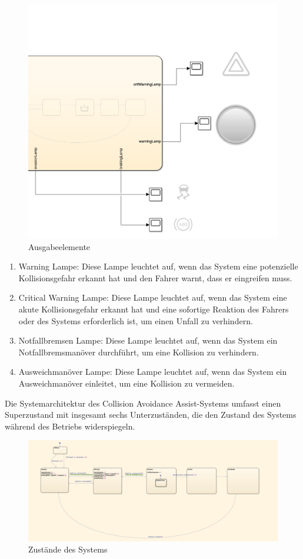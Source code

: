 \begin{figure}[H]
	\centering	
	\includegraphics[width=.8\textwidth]{img/ausgabeelemente}
	\caption[Ausgabeelemente]{Ausgabeelemente}
	\label{fig:Ausgabeelemente des Simulink-Modells}
\end{figure}
\begin{enumerate}
	\item Warning Lampe: Diese Lampe leuchtet auf, wenn das System eine potenzielle Kollisionsgefahr erkannt hat und den Fahrer warnt, dass er eingreifen muss.
	\item Critical Warning Lampe: Diese Lampe leuchtet auf, wenn das System eine akute Kollisionsgefahr erkannt hat und eine sofortige Reaktion des Fahrers oder des Systems erforderlich ist, um einen Unfall zu verhindern.
	\item Notfallbremsen Lampe: Diese Lampe leuchtet auf, wenn das System ein Notfallbremsmanöver durchführt, um eine Kollision zu verhindern.
	\item Ausweichmanöver Lampe: Diese Lampe leuchtet auf, wenn das System ein Ausweichmanöver einleitet, um eine Kollision zu vermeiden.
\end{enumerate}
Die Systemarchitektur des Collision Avoidance Assist-Systems umfasst einen Superzustand mit insgesamt sechs Unterzuständen, die den Zustand des Systems während des Betriebs widerspiegeln.
\begin{figure}[H]
	\centering	
	\includegraphics[width=1.0\textwidth]{img/zustaende}
	\caption[Zustände]{Zustände des Systems}
	\label{fig:Zustände des Simulink-Modells}
\end{figure}
